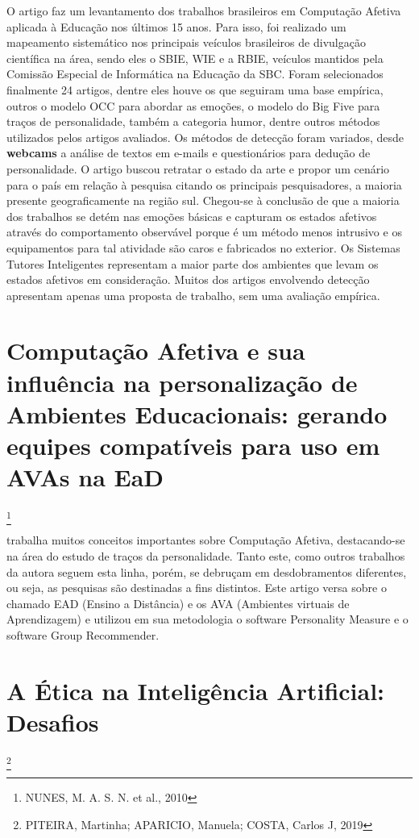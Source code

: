 \documentclass[
    12pt,                   %
    openright,              %
    oneside,                %
    a4paper,                %
    sumario=tradicional,    %
    english,                %
    brazil,                 %
    ]{abntex2}
\begin{document}
 O artigo faz um levantamento dos trabalhos brasileiros em Computação Afetiva aplicada à Educação nos últimos 15 anos. Para isso, foi realizado um mapeamento sistemático nos principais veículos brasileiros de divulgação científica na área, sendo eles o SBIE, WIE e a RBIE, veículos mantidos pela Comissão Especial de Informática na Educação da SBC. Foram selecionados finalmente 24 artigos, dentre eles houve os que seguiram uma base empírica, outros o modelo OCC para abordar as emoções, o modelo do Big Five para traços de personalidade, também a categoria humor, dentre outros métodos utilizados pelos artigos avaliados. Os métodos de detecção foram variados, desde \textbf{webcams} a análise de textos em e-mails e questionários para dedução de personalidade. O artigo buscou retratar o estado da arte e propor um cenário para o país em relação à pesquisa citando os principais pesquisadores, a maioria presente geograficamente na região sul. Chegou-se à conclusão de que a maioria dos trabalhos se detém nas emoções básicas e capturam os estados afetivos através do comportamento observável porque é um método menos intrusivo e os equipamentos para tal atividade são caros e fabricados no exterior. Os Sistemas Tutores Inteligentes representam a maior parte dos ambientes que levam os estados afetivos em consideração. Muitos dos artigos envolvendo detecção apresentam apenas uma proposta de trabalho, sem uma avaliação empírica.

\section{Computação Afetiva e sua influência na personalização de Ambientes Educacionais: gerando equipes compatíveis para uso em AVAs na EaD}\footnote{NUNES, M. A. S. N. et al., 2010}

 trabalha muitos conceitos importantes sobre Computação Afetiva, destacando-se na área do estudo de traços da personalidade. Tanto este, como outros trabalhos da autora seguem esta linha, porém, se debruçam em desdobramentos diferentes, ou seja, as pesquisas são destinadas a fins distintos. Este artigo versa sobre o chamado EAD (Ensino a Distância) e os AVA (Ambientes virtuais de Aprendizagem) e utilizou em sua metodologia o software Personality Measure e o software Group Recommender.


\section{A Ética na Inteligência Artificial: Desafios} \footnote{PITEIRA, Martinha; APARICIO, Manuela; COSTA, Carlos J, 2019}
\end{document}
